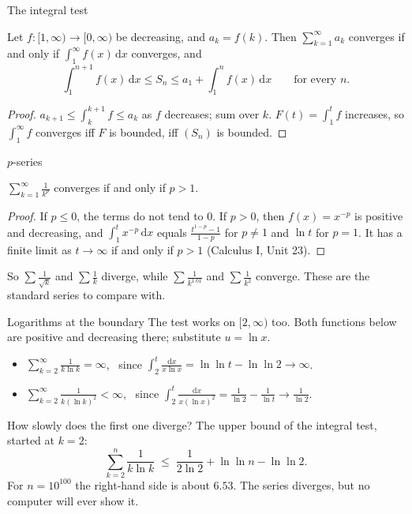 \documentclass{wosm-slides}
\newcommand{\dx}{\,\mathrm{d}x}
\begin{document}
\begin{frame}{The integral test}
  \begin{theorem}
    Let $f\colon [1, \infty) \to [0, \infty)$ be decreasing, and $a_k = f(k)$. Then
    $\sum_{k=1}^\infty a_k$ converges if and only if $\int_1^\infty f(x)\dx$ converges, and
    \[ \int_1^{n+1} f(x)\dx \le S_n \le a_1 + \int_1^n f(x)\dx \qquad\text{for every } n. \]
  \end{theorem}
  \pause
  \begin{proof}
    $a_{k+1} \le \int_k^{k+1} f \le a_k$ as $f$ decreases; sum over $k$.
    $F(t) = \int_1^t f$ increases, so $\int_1^\infty f$ converges iff $F$ is bounded,
    iff $(S_n)$ is bounded.
  \end{proof}
\end{frame}

\begin{frame}{$p$-series}
  \begin{theorem}[$p$-series]
    $\displaystyle\sum_{k=1}^\infty \frac{1}{k^p}$ converges if and only if $p > 1$.
  \end{theorem}
  \pause
  \begin{proof}
    If $p \le 0$, the terms do not tend to $0$. If $p > 0$, then $f(x) = x^{-p}$ is positive
    and decreasing, and $\int_1^t x^{-p} \dx$ equals $\frac{t^{1-p} - 1}{1-p}$ for $p \ne 1$
    and $\ln t$ for $p = 1$. It has a finite limit as $t \to \infty$ if and only if $p > 1$
    (Calculus I, Unit 23).
  \end{proof}
  \pause
  So $\sum \frac{1}{\sqrt k}$ and $\sum \frac1k$ diverge, while $\sum \frac{1}{k^{1.01}}$
  and $\sum \frac{1}{k^2}$ converge. These are the standard series to compare with.
\end{frame}

\begin{frame}{Logarithms at the boundary}
  The test works on $[2, \infty)$ too. Both functions below are positive and decreasing
  there; substitute $u = \ln x$.
  \begin{itemize}
    \item $\displaystyle\sum_{k=2}^\infty \frac{1}{k \ln k} = \infty$, \ since
      $\displaystyle\int_2^t \frac{\mathrm{d}x}{x \ln x} = \ln\ln t - \ln\ln 2 \to \infty$.
    \item $\displaystyle\sum_{k=2}^\infty \frac{1}{k (\ln k)^2} < \infty$, \ since
      $\displaystyle\int_2^t \frac{\mathrm{d}x}{x (\ln x)^2} = \frac{1}{\ln 2} - \frac{1}{\ln t}
      \to \frac{1}{\ln 2}$.
  \end{itemize}
  \pause
  How slowly does the first one diverge? The upper bound of the integral test, started at $k = 2$:
  \[ \sum_{k=2}^{n} \frac{1}{k \ln k} \;\le\; \frac{1}{2 \ln 2} + \ln\ln n - \ln\ln 2 . \]
  For $n = 10^{100}$ the right-hand side is about $6.53$.
  The series diverges, but no computer will ever show it.
\end{frame}
\end{document}
